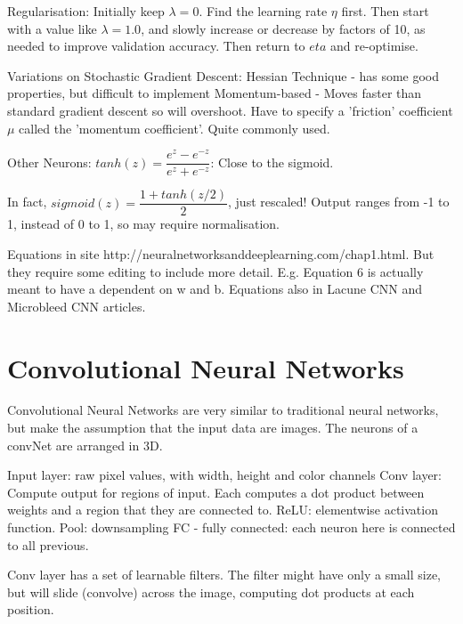 \documentclass[honours,12pt]{unswthesis}
\numberwithin{equation}{section}
\begin{document}
Regularisation:
Initially keep $\lambda = 0$. Find the learning rate $\eta$ first. Then start with a value like $\lambda = 1.0$, and slowly increase or decrease by factors of 10, as needed to improve validation accuracy. Then return to $eta$ and re-optimise.

Variations on Stochastic Gradient Descent:
Hessian Technique - has some good properties, but difficult to implement
Momentum-based - Moves faster than standard gradient descent so will overshoot. Have to specify a 'friction' coefficient $\mu$ called the 'momentum coefficient'. Quite commonly used.

Other Neurons:
$tanh(z) = \dfrac{e^z - e^{-z}}{e^z + e^{-z}}$: Close to the sigmoid.

In fact, $sigmoid(z) = \dfrac{1 + tanh(z/2)}{2}$, just rescaled! Output ranges from -1 to 1, instead of 0 to 1, so may require normalisation.

Equations in site http://neuralnetworksanddeeplearning.com/chap1.html. But they require some editing to include more detail. E.g. Equation 6 is actually meant to have a dependent on w and b.
Equations also in Lacune CNN and Microbleed CNN articles.

\section{Convolutional Neural Networks}\label{convNeuralNets}

Convolutional Neural Networks are very similar to traditional neural networks, but make the assumption that the input data are images.
The neurons of a convNet are arranged in 3D. 

Input layer: raw pixel values, with width, height and color channels
Conv layer: Compute output for regions of input. Each computes a dot product between weights and a region that they are connected to.
ReLU: elementwise activation function.
Pool: downsampling
FC - fully connected: each neuron here is connected to all previous.

Conv layer has a set of learnable filters. The filter might have only a small size, but will slide (convolve) across the image, computing dot products at each position.

\end{document}
